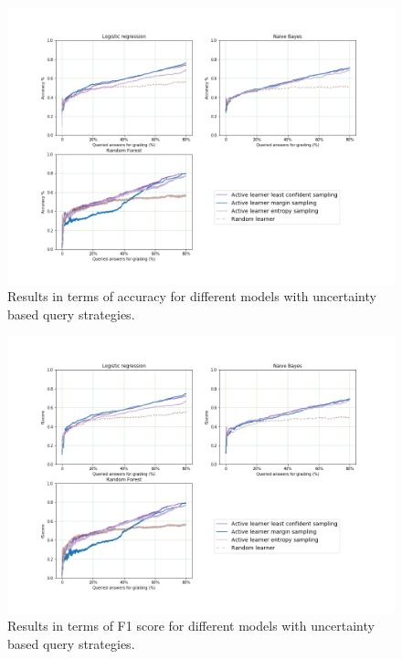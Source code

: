 \begin{figure}[!htb]
	\centering
	\includegraphics[scale=0.45]{images/task8_accuracy_uncertainty}
	\caption{Results in terms of accuracy for different models with uncertainty based query strategies.}
	\label{t8_m_uncertainty}
\end{figure}

\begin{figure}[!htb]
	\centering
	\includegraphics[scale=0.45]{images/task8_f1score_uncertainty}
	\caption{Results in terms of F1 score for different models with uncertainty based query strategies.}
	\label{t8_m_uncertainty_f1}
\end{figure}



